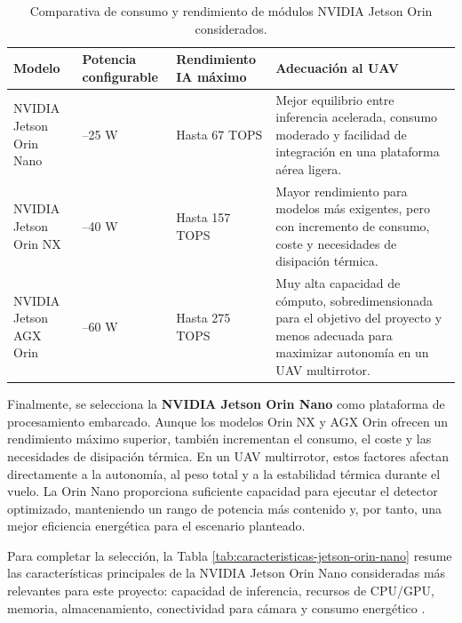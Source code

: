 \begin{table}[H]
\centering
\caption{Comparativa de consumo y rendimiento de módulos NVIDIA Jetson Orin considerados.}
\label{tab:comparativa-jetson-orin}
\renewcommand{\arraystretch}{1.35}
\setlength{\tabcolsep}{4pt}
\begin{tabular}{>{\raggedright\arraybackslash}p{}>{\raggedright\arraybackslash}p{}>{\raggedright\arraybackslash}p{}>{\raggedright\arraybackslash}p{}}
\hline
\textbf{Modelo} & \textbf{Potencia configurable} & \textbf{Rendimiento IA máximo} & \textbf{Adecuación al UAV} \\
\hline
NVIDIA Jetson Orin Nano & 7--25 W & Hasta 67 TOPS & Mejor equilibrio entre inferencia acelerada, consumo moderado y facilidad de integración en una plataforma aérea ligera. \\
NVIDIA Jetson Orin NX & 10--40 W & Hasta 157 TOPS & Mayor rendimiento para modelos más exigentes, pero con incremento de consumo, coste y necesidades de disipación térmica. \\
NVIDIA Jetson AGX Orin & 15--60 W & Hasta 275 TOPS & Muy alta capacidad de cómputo, sobredimensionada para el objetivo del proyecto y menos adecuada para maximizar autonomía en un UAV multirrotor. \\
\hline
\end{tabular}
\end{table}

\vspace{0.3cm}

Finalmente, se selecciona la \textbf{NVIDIA Jetson Orin Nano} como plataforma de procesamiento embarcado. Aunque los modelos Orin NX y AGX Orin ofrecen un rendimiento máximo superior, también incrementan el consumo, el coste y las necesidades de disipación térmica. En un UAV multirrotor, estos factores afectan directamente a la autonomía, al peso total y a la estabilidad térmica durante el vuelo. La Orin Nano proporciona suficiente capacidad para ejecutar el detector optimizado, manteniendo un rango de potencia más contenido y, por tanto, una mejor eficiencia energética para el escenario planteado.

\vspace{0.3cm}

Para completar la selección, la Tabla \ref{tab:caracteristicas-jetson-orin-nano} resume las características principales de la NVIDIA Jetson Orin Nano consideradas más relevantes para este proyecto: capacidad de inferencia, recursos de CPU/GPU, memoria, almacenamiento, conectividad para cámara y consumo energético \cite{NVIDIAJetsonOrin}.

